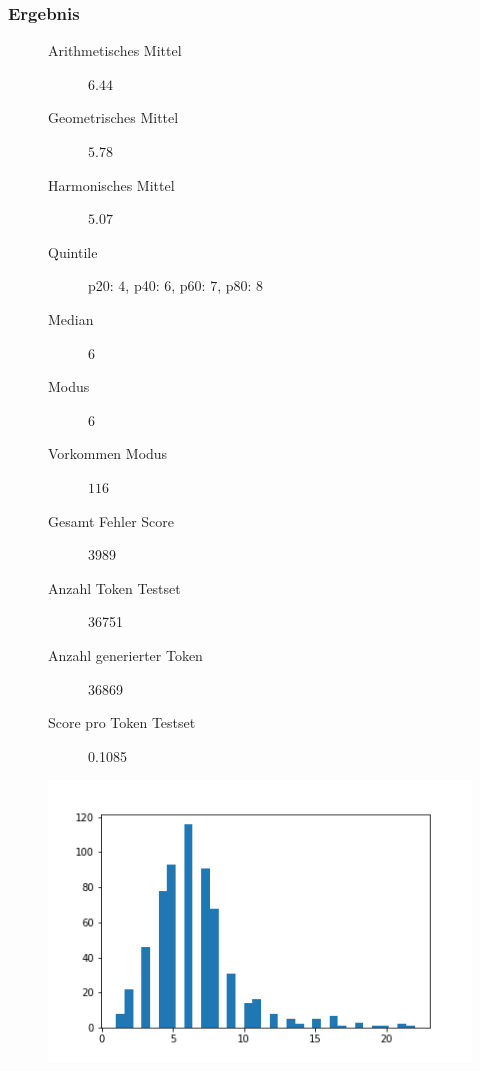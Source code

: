 \documentclass[pdftex,a4paper,halfparskip, article]{scrartcl}
\begin{document}
\subsubsection*{Ergebnis}

\begin{figure}
\centering
\begin{minipage}{.5\textwidth}
  \centering
  \begin{description}
	\item[Arithmetisches Mittel] $6.44$	
	\item[Geometrisches Mittel] $5.78$
	\item[Harmonisches Mittel] $5.07$
	\item[Quintile] p20: $4$, p40: $6$, p60: $7$, p80: $8$
	\item[Median] $6$
	\item[Modus] $6$
	\item[Vorkommen Modus] $116$
	\item[Gesamt Fehler Score] 3989
	\item[Anzahl Token Testset] 36751 
	\item[Anzahl generierter Token] 36869
	\item[Score pro Token Testset]  0.1085
\end{description}
  \label{fig:lage_bin15}
\end{minipage}%
\begin{minipage}{.5\textwidth}
  \centering
  \includegraphics[width=1\linewidth]{predictions_bin15_histogramm}
  \label{fig:hist_bin15}
\end{minipage}
\end{figure}
\end{document}
